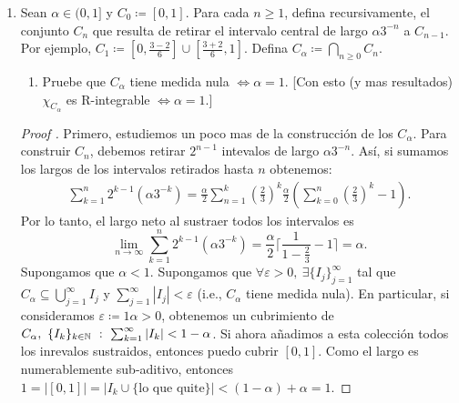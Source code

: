 \begin{enumerate}
	\item Sean $\alpha \in (0,1]$ y $C_0 \coloneq [0,1]$. Para cada $n\geq 1$, defina recursivamente, el conjunto $C_n$ que resulta de retirar el intervalo central de largo $\alpha 3^{-n}$ a $C_{n-1}$. Por ejemplo, $C_1 \coloneq \left[ 0,\frac{3-2}{6} \right] \cup \left[ \frac{3+2}{6},1 \right]$. Defina $C_{\alpha} \coloneq \displaystyle\bigcap_{n\geq 0} C_n$.
	\begin{enumerate}
		\item Pruebe que $C_{\alpha}$ tiene medida nula $\iff \alpha = 1$. [Con esto (y mas resultados) $\chi_{C_{\alpha}}$ es R-integrable $\iff \alpha = 1$.]
	\end{enumerate}
	\begin{proof}[Proof ]
		Primero, estudiemos un poco mas de la construcción de los $C_{\alpha}$. Para construir $C_n$, debemos retirar $2^{n-1}$ intevalos de largo $\alpha 3^{-n}$. Así, si sumamos los largos de los intervalos retirados hasta $n$ obtenemos:
		\begin{align*}
			\sum_{k=1}^{n} 2^{k-1}(\alpha 3^{-k}) = \frac{\alpha}{2} \sum_{n=1}^{k} \left( \frac{2}{3} \right)^k \frac{\alpha}{2} \left( \sum_{k=0}^{n} \left( \frac{2}{3} \right)^k - 1 \right)
		.\end{align*}
		Por lo tanto, el largo neto al sustraer todos los intervalos es 
		\[ \lim_{n \to \infty} \sum_{k=1}^{n} 2^{k-1} (\alpha 3^{-k}) = \frac{\alpha}{2}  \lceil \frac{1}{1-\frac{2}{3}} -1 \rceil = \alpha. \]
		Supongamos que $\alpha < 1$. Supongamos que $\forall \varepsilon > 0,\ \exists \{ I_j \}_{j=1}^{\infty}$ tal que $C_{\alpha} \subseteq \displaystyle\bigcup_{j=1}^{\infty} I_j$ y $\sum_{j=1}^{\infty} |I_j| < \varepsilon$ (i.e., $C_{\alpha}$ tiene medida nula). En particular, si consideramos $\varepsilon \coloneq 1 \alpha > 0$, obtenemos un cubrimiento de $C_{\alpha},\ \{I_k\}_{k\in\N}\ : \ \sum_{k=1}^{\infty} |I_k| < 1 - \alpha$. Si ahora añadimos a esta colección todos los inrevalos sustraidos, entonces puedo cubrir $[0,1]$. Como el largo es numerablemente sub-aditivo, entonces $1 = |[0,1]| = | I_k \cup \{\text{lo que quite}\}|< (1-\alpha) + \alpha = 1$.      
	\end{proof}
\end{enumerate}
